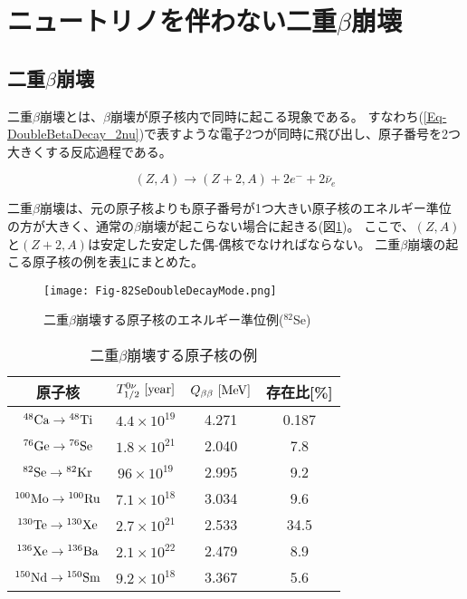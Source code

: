\documentclass[a4paper,10pt]{jreport}
\begin{document}
\section{ニュートリノを伴わない二重$\beta$崩壊}




\subsection{二重$\beta$崩壊}

二重$\beta$崩壊とは、$\beta$崩壊が原子核内で同時に起こる現象である。
すなわち(\ref{Eq-DoubleBetaDecay_2nu})で表すような電子2つが同時に飛び出し、原子番号を2つ大きくする反応過程である。

\begin{equation} \label{Eq-DoubleBetaDecay_2nu}
	(Z,A)\to(Z+2,A)+2e^-+2\bar{\nu}_e
\end{equation}

二重$\beta$崩壊は、元の原子核よりも原子番号が1つ大きい原子核のエネルギー準位の方が大きく、通常の$\beta$崩壊が起こらない場合に起きる(図\ref{Fig-82SeDoubleDecayMode})。
ここで、$(Z,A)$と$(Z+2,A)$は安定した安定した偶-偶核でなければならない。
二重$\beta$崩壊の起こる原子核の例を表\ref{Tab-82SeDoubleDecayTable}にまとめた。

\begin{figure}[H]
	\center
	\texttt{[image: Fig-82SeDoubleDecayMode.png]}
	\caption{二重$\beta$崩壊する原子核のエネルギー準位例($^{82}$Se)} \label{Fig-82SeDoubleDecayMode}
\end{figure}

\begin{table}[H] 
	\center
	\caption{二重$\beta$崩壊する原子核の例\cite{Syuron_2011}} \label{Tab-82SeDoubleDecayTable}
	\begin{tabular}{cccc}
		\hline
		原子核 & $T_{1/2}^{0\nu}\ [\rm{year}]$ & $Q_{\beta\beta}\ [\rm{MeV}]$ & 存在比[\%] \\
		\hline
		$\rm{{^{48}Ca} \to {^{48}Ti}}$ & $4.4\times 10^{19}$ & 4.271 & 0.187 \\
		$\rm{{^{76}Ge} \to {^{76}Se}}$ & $1.8\times 10^{21}$ & 2.040 & 7.8 \\
		$\rm{{^{82}Se} \to {^{82}Kr}}$ & $96\times 10^{19}$ & 2.995 & 9.2 \\
		$\rm{{^{100}Mo} \to {^{100}Ru}}$ & $7.1\times 10^{18}$ & 3.034 & 9.6 \\
		$\rm{{^{130}Te} \to {^{130}Xe}}$ & $2.7\times 10^{21}$ & 2.533 & 34.5 \\
		$\rm{{^{136}Xe} \to {^{136}Ba}}$ & $2.1\times 10^{22}$ & 2.479 & 8.9 \\
		$\rm{{^{150}Nd} \to {^{150}Sm}}$ & $9.2\times 10^{18}$ & 3.367 & 5.6 \\
		\hline
	\end{tabular}
\end{table}
\end{document}
